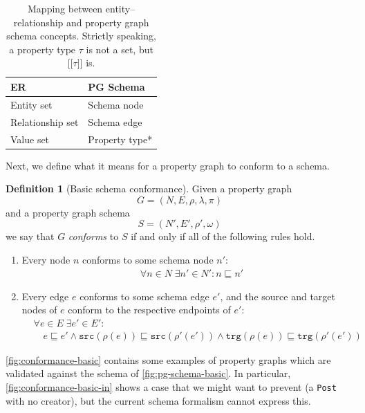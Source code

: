 \documentclass{report}
\theoremstyle{definition}
\newtheorem{definition}{Definition}
\newcommand{\src}{\mathtt{src}}
\newcommand{\trg}{\mathtt{trg}}
\newcommand{\ptype}{\tau}
\newcommand{\lsem}{\ensuremath{[\![}}
\newcommand{\rsem}{\ensuremath{]\!]}}
\newcommand{\sem}[1]{\ensuremath{\lsem #1 \rsem}}
\newcommand{\conf}{\sqsubseteq}
\begin{document}
\begin{table}[t]
  \centering
  \begin{tabular}{ll}
    \hline
    \textbf{ER}      & \textbf{PG Schema} \\
    \hline
    Entity set       & Schema node        \\
    Relationship set & Schema edge        \\
    Value set        & Property type*     \\
    \hline
  \end{tabular}
  \caption{Mapping between entity--relationship and property graph schema concepts. Strictly speaking, a property type $\ptype$ is not a set, but $\sem{\ptype}$ is.}
  \label{tab:er-pg-schema}
\end{table}

Next, we define what it means for a property graph to conform to a schema.

\begin{definition}[Basic schema conformance]
  \label{def:schema-conformance-basic}
  Given a property graph $$G = (N, E, \rho, \lambda, \pi)$$ and a property graph schema $$S = (N', E', \rho', \omega)$$ we say that $G$ \emph{conforms} to $S$ if and only if all of the following rules hold.

  \begin{enumerate}
    \item\label{rule:basic-node}
          Every node $n$ conforms to some schema node $n'$:
          \begin{align*}
             & \forall n \in N \; \exists n' \in N' : n \conf n'
          \end{align*}

    \item\label{rule:basic-edge}
          Every edge $e$ conforms to some schema edge $e'$, and the source and target nodes of $e$ conform to the respective endpoints of $e'$:
          \begin{align*}
             & \forall e \in E \; \exists e' \in E' :                      \\
             & \quad e \conf e' \wedge \src(\rho(e)) \conf \src(\rho'(e'))
            \wedge \trg(\rho(e)) \conf \trg(\rho'(e'))
          \end{align*}
  \end{enumerate}
\end{definition}

\autoref{fig:conformance-basic} contains some examples of property graphs which are validated against the schema of \autoref{fig:pg-schema-basic}. In particular, \autoref{fig:conformance-basic-in} shows a case that we might want to prevent (a \texttt{Post} with no creator), but the current schema formalism cannot express this.
\end{document}
